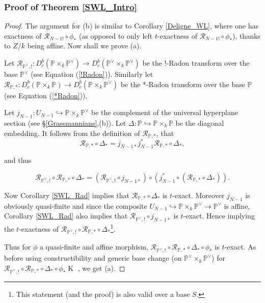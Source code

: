 \documentclass[12pt, reqno]{amsart}
\theoremstyle{plain}
\theoremstyle{definition}
\theoremstyle{definition}
\newcommand{\bbP}{{\mathbb P}}
\newcommand{\cR}{{\mathcal R}}
\DeclareMathOperator{\KK}{K}
\begin{document}
\subsubsection{Proof of Theorem \ref{SWL_Intro}}\label{proof_SWL}


\begin{proof}
The argument for (b) is similar to Corollary \ref{Deligne_WL}, where one has exactness of $\cR_{N-1!} \circ \phi_*$ (as opposed to only left $t$-exactness of $\cR_{N-1!}\circ \phi_*$), thanks to $Z/k$ being affine. Now shall we prove (a). 


Let $\cR_{\bbP^{\vee},!} \colon D^{b}_c(\bbP \times_k \bbP^{\vee}) \to D^b_c(\bbP^{\vee} \times_k \bbP^{\vee})$ be the !-Radon transform over the base $\bbP^{\vee}$ (see Equation (\ref{!Radon})). 
Similarly let $\cR_{\bbP,*} \colon D^{b}_c(\bbP \times_k \bbP) \to D^b_c(\bbP \times_k \bbP^{\vee})$ be the *-Radon transform over the base $\bbP$ (see Equation (\ref{*Radon})).

Let $j_{N-1} \colon U_{N-1} \hookrightarrow \bbP \times_k \bbP^{\vee}$ be the complement of the universal hyperplane section (see \S \ref{Grassmannians},(b)). Let $\Delta \colon \bbP \hookrightarrow \bbP \times_k \bbP$ be the diagonal embedding. It follows from the definition of $\cR_{\bbP,*}$, that 
\[
\cR_{\bbP,*} \circ \Delta_*=j_{N-1*}j_{N-1}^*\cR_{\bbP,*} \circ \Delta_*,
\]

\noindent and thus

\[
\cR_{\bbP^{\vee},!} \circ \cR_{\bbP,*} \circ \Delta_*=(\cR_{\bbP^{\vee},!} \circ j_{N-1*}) \circ \left (j_{N-1}^* \circ \left (\cR_{\bbP,*} \circ \Delta_* \right ) \right ).
\]

Now Corollary \ref{SWL_Rad} implies that $\cR_{\bbP,*} \circ \Delta_*$ is $t$-exact. Moreover $j_{N-1}$ is obviously quasi-finite and since the composite $U_{N-1} \hookrightarrow \bbP \times_k \bbP^{\vee} \to \bbP^{\vee}$ is affine, Corollary \ref{SWL_Rad} also implies that $\cR_{\bbP^{\vee},!} \circ j_{N-1*}$ is $t$-exact. Hence implying the $t$-exactness of $\cR_{\bbP^{\vee},!} \circ \cR_{\bbP,*} \circ \Delta_*$\footnote{This statement (and the proof) is also valid over a base $S$.}.

Thus for $\phi$ a quasi-finite and affine morphism, $\cR_{\bbP^{\vee},!} \circ \cR_{\bbP,*} \circ \Delta_* \circ \phi_*$ is $t$-exact. As before using constructibility and generic base change (on $\bbP^{\vee} \times_k \bbP^{\vee}$) for $\cR_{\bbP^{\vee},!} \circ \cR_{\bbP,*} \circ \Delta_* \circ \phi_*\KK$ , we get (a).

\end{proof}
\end{document}
